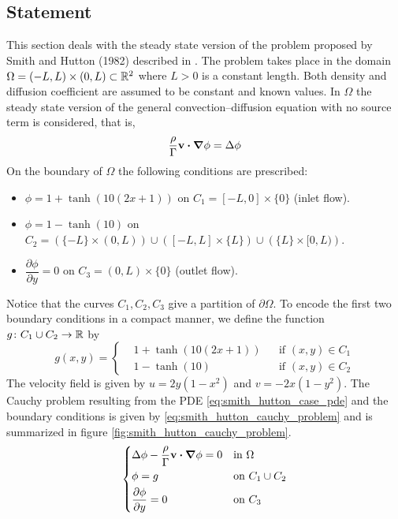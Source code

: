 
\subsection{Statement}

This section deals with the steady state version of the problem proposed by Smith and Hutton (1982) described in \cite{smith1982numerical}. The problem takes place in the domain $\Omega = (-L,L) \times (0,L) \subset \mathbb{R}^2$ where $L > 0$ is a constant length. Both density and diffusion coefficient are assumed to be constant and known values. In $\Omega$ the steady state version of the general convection--diffusion equation with no source term is considered, that is,
\begin{equation} \label{eq:smith_hutton_case_pde}
	\frac{\rho}{\Gamma} \vb{v} \vdot \grad{\phi} = \Delta{\phi}
\end{equation}
On the boundary of $\Omega$ the following conditions are prescribed:
\begin{itemize}[topsep=0pt]
	\item $\phi = 1 + \tanh(10(2x+1))$ on $C_1 = [-L,0] \times \{ 0 \}$ (inlet flow).
	\item $\phi = 1 - \tanh(10)$ on $C_2 = \left( \{ -L \} \times (0,L) \right) \cup \left( [-L,L] \times \{ L \} \right) \cup \left( \{ L \} \times [0,L) \right)$.
	\item $\dfrac{\partial \phi}{\partial y} = 0$ on $C_3 = (0,L) \times \{ 0 \}$ (outlet flow).
\end{itemize}
Notice that the curves $C_1, C_2, C_3$ give a partition of $\partial \Omega$. To encode the first two boundary conditions in a compact manner, we define the function $g \colon C_1 \cup C_2 \rightarrow \mathbb{R}$ by
\begin{equation}
	g(x,y) = 
	\left\{
	\begin{aligned}
		&1 + \tanh(10(2x + 1)) 	& &\text{if } (x,y) \in C_1 \\
		&1 - \tanh(10) 			& &\text{if } (x,y) \in C_2
	\end{aligned}
	\right.
\end{equation}
The velocity field is given by $u = 2 y (1 - x^2)$ and $v = -2 x (1 - y^2)$. The Cauchy problem resulting from the PDE \eqref{eq:smith_hutton_case_pde} and the boundary conditions is given by \eqref{eq:smith_hutton_cauchy_problem} and is summarized in figure \ref{fig:smith_hutton_cauchy_problem}.
\begin{equation} \label{eq:smith_hutton_cauchy_problem} 
	\left\{
	\begin{aligned}
		&\Delta \phi - \frac{\rho}{\Gamma} \vb{v} \vdot \grad{\phi} = 0 &
		&\text{in } \Omega \\
		&\phi = g & 
		&\text{on } C_1 \cup C_2 \\
		&\frac{\partial \phi}{\partial y} = 0 & 
		&\text{on } C_3
	\end{aligned}
	\right.
\end{equation}

